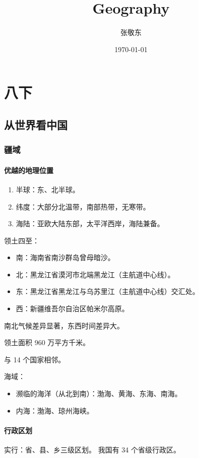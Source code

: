 \documentclass[12pt,a4paper]{article}
\title{Geography}
\author{张敬东}
\date{\today}
\begin{document}
\maketitle
\newpage\newpage

\tableofcontents
\newpage

\setcounter{page}{1}

\section{八下}
\subsection{从世界看中国}
\subsubsection{疆域}
\paragraph*{优越的地理位置}

\begin{enumerate}
	\item 半球：东、北半球。
	\item 纬度：大部分北温带，南部热带，无寒带。
	\item 海陆：亚欧大陆东部，太平洋西岸，海陆兼备。
\end{enumerate}

领土四至：
\begin{itemize}
	\item 南：海南省南沙群岛曾母暗沙。
	\item 北：黑龙江省漠河市北端黑龙江（主航道中心线）。
	\item 东：黑龙江省黑龙江与乌苏里江（主航道中心线）交汇处。
	\item 西：新疆维吾尔自治区帕米尔高原。
\end{itemize}

南北气候差异显著，东西时间差异大。

领土面积 960 万平方千米。

与 14 个国家相邻。

海域：
\begin{itemize}
	\item 濒临的海洋（从北到南）：渤海、黄海、东海、南海。
	\item 内海：渤海、琼州海峡。
\end{itemize}

\paragraph*{行政区划}

实行：省、县、乡三级区划。
我国有 34 个省级行政区。
\end{document}
